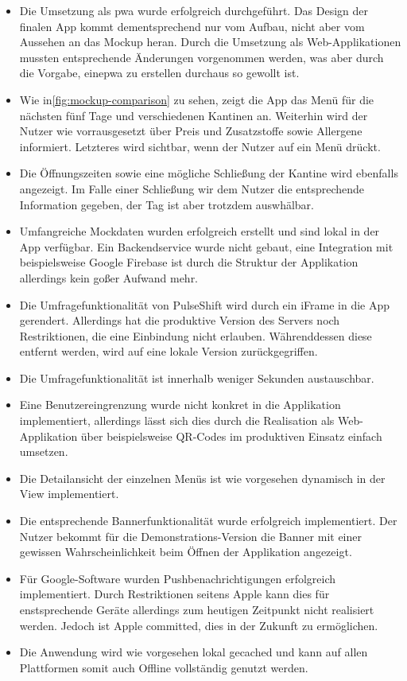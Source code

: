 \begin{itemize}
\item Die Umsetzung als \gls{pwa} wurde erfolgreich durchgeführt. Das Design der finalen App kommt dementsprechend nur vom Aufbau, nicht aber vom Aussehen an das Mockup heran. Durch die Umsetzung als Web-Applikationen mussten entsprechende Änderungen vorgenommen werden, was aber durch die Vorgabe, eine\gls{pwa} zu erstellen durchaus so gewollt ist.
\item Wie in\vref{fig:mockup-comparison} zu sehen, zeigt die App das Menü für die nächsten fünf Tage und verschiedenen Kantinen an. Weiterhin wird der Nutzer wie vorrausgesetzt über Preis und Zusatzstoffe sowie Allergene informiert. Letzteres wird sichtbar, wenn der Nutzer auf ein Menü drückt.
\item Die Öffnungszeiten sowie eine mögliche Schließung der Kantine wird ebenfalls angezeigt. Im Falle einer Schließung wir dem Nutzer die entsprechende Information gegeben, der Tag ist aber trotzdem auswhälbar.
\item Umfangreiche Mockdaten wurden erfolgreich erstellt und sind lokal in der App verfügbar. Ein Backendservice wurde nicht gebaut, eine Integration mit beispielsweise Google Firebase ist durch die Struktur der Applikation allerdings kein goßer Aufwand mehr.
\item Die Umfragefunktionalität von PulseShift wird durch ein iFrame in die App gerendert. Allerdings hat die produktive Version des Servers noch Restriktionen, die eine Einbindung nicht erlauben. Währenddessen diese entfernt werden, wird auf eine lokale Version zurückgegriffen.
\item Die Umfragefunktionalität ist innerhalb weniger Sekunden austauschbar.
\item Eine Benutzereingrenzung wurde nicht konkret in die Applikation implementiert, allerdings lässt sich dies durch die Realisation als Web-Applikation über beispielsweise QR-Codes im produktiven Einsatz einfach umsetzen.
\item Die Detailansicht der einzelnen Menüs ist wie vorgesehen dynamisch in der View implementiert.
\item Die entsprechende Bannerfunktionalität wurde erfolgreich implementiert. Der Nutzer bekommt für die Demonstrations-Version die Banner mit einer gewissen Wahrscheinlichkeit beim Öffnen der Applikation angezeigt.
\item Für Google-Software wurden Pushbenachrichtigungen erfolgreich implementiert. Durch Restriktionen seitens Apple kann dies für enstsprechende Geräte allerdings zum heutigen Zeitpunkt nicht realisiert werden. Jedoch ist Apple committed, dies in der Zukunft zu ermöglichen.
\item Die Anwendung wird wie vorgesehen lokal gecached und kann auf allen Plattformen somit auch Offline vollständig genutzt werden.
\end{itemize}